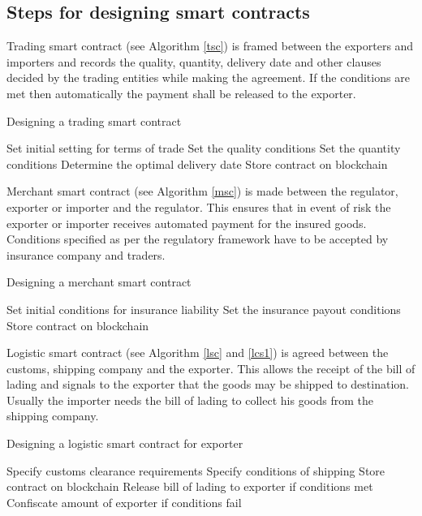 \documentclass[num-refs]{wiley-article}
\begin{document}
\subsection{Steps for designing smart contracts}
\label{algo}

Trading smart contract (see Algorithm \ref{tsc}) is framed between the exporters and importers and records the quality, quantity, delivery date and other clauses decided by the trading entities while making the agreement. If the conditions are met then automatically the payment shall be released to the exporter. 

\begin{algorithm}[!h]
\caption{Designing a trading smart contract}

\begin{algorithmic}[1]
 \State Set initial setting for terms of trade
 \State Set the quality conditions
 \State Set the quantity conditions
 \State Determine the optimal delivery date
 \State Store contract on blockchain
\end{algorithmic}
\label{tsc}
\end{algorithm}

Merchant smart contract (see Algorithm \ref{msc}) is made between the regulator, exporter or importer and the regulator. This ensures that in event of risk the exporter or importer receives automated payment for the insured goods. Conditions specified as per the regulatory framework have to be accepted by insurance company and traders.

\begin{algorithm}[!h]
\caption{Designing a merchant smart contract}
\begin{algorithmic}[1]
 \State Set initial conditions for insurance liability
 \State Set the insurance payout conditions
 \State Store contract on blockchain
\end{algorithmic}
\label{msc}
\end{algorithm}

Logistic smart contract (see Algorithm \ref{lsc} and \ref{lcs1}) is agreed between the customs, shipping company and the exporter. This allows the receipt of the bill of lading and signals to the exporter that the goods may be shipped to destination. Usually the importer needs the bill of lading to collect his goods from the shipping company. 

\begin{algorithm}[!h]
\caption{Designing a logistic smart contract for exporter}
\begin{algorithmic}[1]
 \State Specify customs clearance requirements
 \State Specify conditions of shipping
 \State Store contract on blockchain
 \State Release bill of lading to exporter if conditions met
 \State Confiscate amount of exporter if conditions fail
\end{algorithmic}
\label{lcs1}
\end{algorithm}
\end{document}
